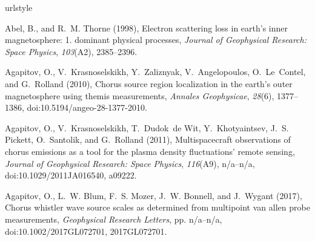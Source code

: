 \documentclass[draft, linenumbers]{agujournal}
\begin{document}



%

\begin{thebibliography}{49}
\providecommand{\natexlab}[1]{#1}
\expandafter\ifx\csname urlstyle\endcsname\relax
  \providecommand{\doi}[1]{doi:\discretionary{}{}{}#1}\else
  \providecommand{\doi}{doi:\discretionary{}{}{}\begingroup
  \urlstyle{rm}\Url}\fi

Abel, B., and R.~M. Thorne (1998), Electron scattering loss in earth's inner
  magnetosphere: 1. dominant physical processes, \textit{Journal of Geophysical
  Research: Space Physics}, \textit{103}(A2), 2385--2396.

Agapitov, O., V.~Krasnoselskikh, Y.~Zaliznyak, V.~Angelopoulos, O.~Le~Contel,
  and G.~Rolland (2010), Chorus source region localization in the earth's outer
  magnetosphere using themis measurements, \textit{Annales Geophysicae},
  \textit{28}(6), 1377--1386, \doi{10.5194/angeo-28-1377-2010}.

Agapitov, O., V.~Krasnoselskikh, T.~Dudok~de Wit, Y.~Khotyaintsev, J.~S.
  Pickett, O.~Santolik, and G.~Rolland (2011), Multispacecraft observations of
  chorus emissions as a tool for the plasma density fluctuations' remote
  sensing, \textit{Journal of Geophysical Research: Space Physics},
  \textit{116}(A9), n/a--n/a, \doi{10.1029/2011JA016540}, a09222.

Agapitov, O., L.~W. Blum, F.~S. Mozer, J.~W. Bonnell, and J.~Wygant (2017),
  Chorus whistler wave source scales as determined from multipoint van allen
  probe measurements, \textit{Geophysical Research Letters}, pp. n/a--n/a,
  \doi{10.1002/2017GL072701}, 2017GL072701.


\end{thebibliography}
\end{document}

